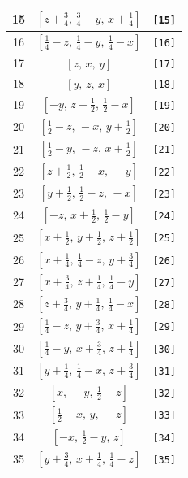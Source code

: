 \documentclass[fleqn,8pt]{jsarticle}
\begin{document}
\begin{longtable}{ccc}
15 & $\left[ z + \frac{3}{4},\, \frac{3}{4} - y,\, x + \frac{1}{4} \right]$ & {\tt [15]} \\ \hline
16 & $\left[ \frac{1}{4} - z,\, \frac{1}{4} - y,\, \frac{1}{4} - x \right]$ & {\tt [16]} \\ \hline
17 & $\left[ z,\, x,\, y \right]$ & {\tt [17]} \\ \hline
18 & $\left[ y,\, z,\, x \right]$ & {\tt [18]} \\ \hline
19 & $\left[ - y,\, z + \frac{1}{2},\, \frac{1}{2} - x \right]$ & {\tt [19]} \\ \hline
20 & $\left[ \frac{1}{2} - z,\, - x,\, y + \frac{1}{2} \right]$ & {\tt [20]} \\ \hline
21 & $\left[ \frac{1}{2} - y,\, - z,\, x + \frac{1}{2} \right]$ & {\tt [21]} \\ \hline
22 & $\left[ z + \frac{1}{2},\, \frac{1}{2} - x,\, - y \right]$ & {\tt [22]} \\ \hline
23 & $\left[ y + \frac{1}{2},\, \frac{1}{2} - z,\, - x \right]$ & {\tt [23]} \\ \hline
24 & $\left[ - z,\, x + \frac{1}{2},\, \frac{1}{2} - y \right]$ & {\tt [24]} \\ \hline
25 & $\left[ x + \frac{1}{2},\, y + \frac{1}{2},\, z + \frac{1}{2} \right]$ & {\tt [25]} \\ \hline
26 & $\left[ x + \frac{1}{4},\, \frac{1}{4} - z,\, y + \frac{3}{4} \right]$ & {\tt [26]} \\ \hline
27 & $\left[ x + \frac{3}{4},\, z + \frac{1}{4},\, \frac{1}{4} - y \right]$ & {\tt [27]} \\ \hline
28 & $\left[ z + \frac{3}{4},\, y + \frac{1}{4},\, \frac{1}{4} - x \right]$ & {\tt [28]} \\ \hline
29 & $\left[ \frac{1}{4} - z,\, y + \frac{3}{4},\, x + \frac{1}{4} \right]$ & {\tt [29]} \\ \hline
30 & $\left[ \frac{1}{4} - y,\, x + \frac{3}{4},\, z + \frac{1}{4} \right]$ & {\tt [30]} \\ \hline
31 & $\left[ y + \frac{1}{4},\, \frac{1}{4} - x,\, z + \frac{3}{4} \right]$ & {\tt [31]} \\ \hline
32 & $\left[ x,\, - y,\, \frac{1}{2} - z \right]$ & {\tt [32]} \\ \hline
33 & $\left[ \frac{1}{2} - x,\, y,\, - z \right]$ & {\tt [33]} \\ \hline
34 & $\left[ - x,\, \frac{1}{2} - y,\, z \right]$ & {\tt [34]} \\ \hline
35 & $\left[ y + \frac{3}{4},\, x + \frac{1}{4},\, \frac{1}{4} - z \right]$ & {\tt [35]} \\ \hline

\end{longtable}
\end{document}

